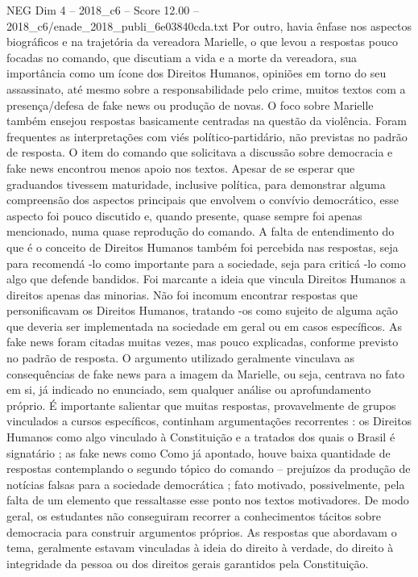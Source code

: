 \begin{textsample}{NEG Dim 4 – 2018\_c6 – Score 12.00 – 2018\_c6/enade\_2018\_publi\_6e03840cda.txt}
Por outro, havia ênfase nos aspectos biográficos e na trajetória da vereadora Marielle, o que levou a respostas pouco focadas no comando, que discutiam a vida e a morte da vereadora, sua importância como um ícone dos Direitos Humanos, opiniões em torno do seu assassinato, até mesmo sobre a responsabilidade pelo crime, muitos textos com a presença/defesa de fake news ou produção de novas.
O foco sobre Marielle também ensejou respostas basicamente centradas na questão da violência.
Foram frequentes as interpretações com viés político-partidário, não previstas no padrão de resposta.
O item do comando que solicitava a discussão sobre democracia e fake news encontrou menos apoio nos textos.
Apesar de se esperar que graduandos tivessem maturidade, inclusive política, para demonstrar alguma compreensão dos aspectos principais que envolvem o convívio democrático, esse aspecto foi pouco discutido e, quando presente, quase sempre foi apenas mencionado, numa quase reprodução do comando.
A falta de entendimento do que é o conceito de Direitos Humanos também foi percebida nas respostas, seja para recomendá -lo como importante para a sociedade, seja para criticá -lo como algo que defende bandidos.
Foi marcante a ideia que vincula Direitos Humanos a direitos apenas das minorias.
Não foi incomum encontrar respostas que personificavam os Direitos Humanos, tratando -os como sujeito de alguma ação que deveria ser implementada na sociedade em geral ou em casos específicos.
As fake news foram citadas muitas vezes, mas pouco explicadas, conforme previsto no padrão de resposta.
O argumento utilizado geralmente vinculava as consequências de fake news para a imagem da Marielle, ou seja, centrava no fato em si, já indicado no enunciado, sem qualquer análise ou aprofundamento próprio.
É importante salientar que muitas respostas, provavelmente de grupos vinculados a cursos específicos, continham argumentações recorrentes : os Direitos Humanos como algo vinculado à Constituição e a tratados dos quais o Brasil é signatário ; as fake news como Como já apontado, houve baixa quantidade de respostas contemplando o segundo tópico do comando – prejuízos da produção de notícias falsas para a sociedade democrática ; fato motivado, possivelmente, pela falta de um elemento que ressaltasse esse ponto nos textos motivadores.
De modo geral, os estudantes não conseguiram recorrer a conhecimentos tácitos sobre democracia para construir argumentos próprios.
As respostas que abordavam o tema, geralmente estavam vinculadas à ideia do direito à verdade, do direito à integridade da pessoa ou dos direitos gerais garantidos pela Constituição.

\end{textsample}
